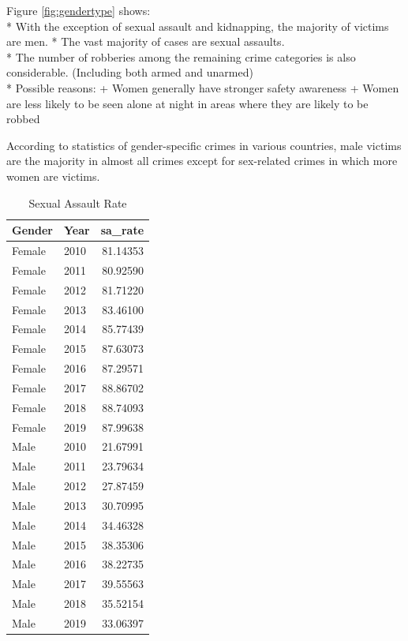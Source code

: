 \documentclass[11pt,a4paper,]{article}
\begin{document}
Figure \ref{fig:gendertype} shows:\\
* With the exception of sexual assault and kidnapping, the majority of victims are men.
* The vast majority of cases are sexual assaults.\\
* The number of robberies among the remaining crime categories is also considerable. (Including both armed and unarmed)\\
* Possible reasons:
+ Women generally have stronger safety awareness
+ Women are less likely to be seen alone at night in areas where they are likely to be robbed

According to statistics of gender-specific crimes in various countries, male victims are the majority in almost all crimes except for sex-related crimes in which more women are victims.

\begin{table}

\caption{\label{tab:tablesa}Sexual Assault Rate}
\centering
\begin{tabular}[t]{l|l|r}
\hline
Gender & Year & sa\_rate\\
\hline
Female & 2010 & 81.14353\\
\hline
Female & 2011 & 80.92590\\
\hline
Female & 2012 & 81.71220\\
\hline
Female & 2013 & 83.46100\\
\hline
Female & 2014 & 85.77439\\
\hline
Female & 2015 & 87.63073\\
\hline
Female & 2016 & 87.29571\\
\hline
Female & 2017 & 88.86702\\
\hline
Female & 2018 & 88.74093\\
\hline
Female & 2019 & 87.99638\\
\hline
Male & 2010 & 21.67991\\
\hline
Male & 2011 & 23.79634\\
\hline
Male & 2012 & 27.87459\\
\hline
Male & 2013 & 30.70995\\
\hline
Male & 2014 & 34.46328\\
\hline
Male & 2015 & 38.35306\\
\hline
Male & 2016 & 38.22735\\
\hline
Male & 2017 & 39.55563\\
\hline
Male & 2018 & 35.52154\\
\hline
Male & 2019 & 33.06397\\
\hline
\end{tabular}
\end{table}
\end{document}

